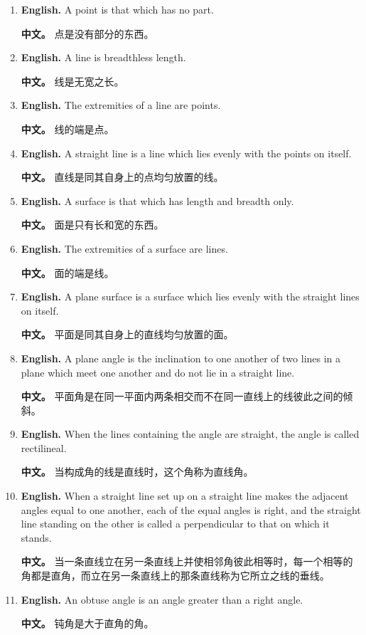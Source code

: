 \begin{enumerate}
\item \textbf{English.} A point is that which has no part. \par\textbf{中文。} 点是没有部分的东西。
\item \textbf{English.} A line is breadthless length. \par\textbf{中文。} 线是无宽之长。
\item \textbf{English.} The extremities of a line are points. \par\textbf{中文。} 线的端是点。
\item \textbf{English.} A straight line is a line which lies evenly with the points on itself. \par\textbf{中文。} 直线是同其自身上的点均匀放置的线。
\item \textbf{English.} A surface is that which has length and breadth only. \par\textbf{中文。} 面是只有长和宽的东西。
\item \textbf{English.} The extremities of a surface are lines. \par\textbf{中文。} 面的端是线。
\item \textbf{English.} A plane surface is a surface which lies evenly with the straight lines on itself. \par\textbf{中文。} 平面是同其自身上的直线均匀放置的面。
\item \textbf{English.} A plane angle is the inclination to one another of two lines in a plane which meet one another and do not lie in a straight line. \par\textbf{中文。} 平面角是在同一平面内两条相交而不在同一直线上的线彼此之间的倾斜。
\item \textbf{English.} When the lines containing the angle are straight, the angle is called rectilineal. \par\textbf{中文。} 当构成角的线是直线时，这个角称为直线角。
\item \textbf{English.} When a straight line set up on a straight line makes the adjacent angles equal to one another, each of the equal angles is right, and the straight line standing on the other is called a perpendicular to that on which it stands. \par\textbf{中文。} 当一条直线立在另一条直线上并使相邻角彼此相等时，每一个相等的角都是直角，而立在另一条直线上的那条直线称为它所立之线的垂线。
\item \textbf{English.} An obtuse angle is an angle greater than a right angle. \par\textbf{中文。} 钝角是大于直角的角。

\end{enumerate}
